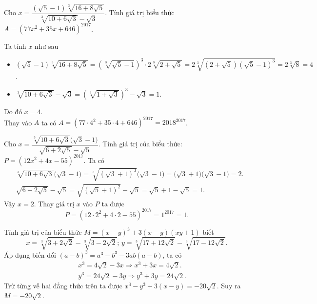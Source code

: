 \begin{bt}%
	Cho $x=\dfrac{(\sqrt{5}-1)\sqrt[3]{16+8\sqrt{5}}}{\sqrt[3]{10+6\sqrt{3}}-\sqrt{3}}$. Tính giá trị biểu thức $A=(77x^2+35x+646)^{2017}$.
	\loigiai
	{
		Ta tính $x$ như sau
		\begin{itemize}
			\item $\left(\sqrt{5}-1\right)\sqrt[3]{16+8\sqrt{5}}=\left(\sqrt[3]{\sqrt{5}-1}\right)^3 \cdot 2\sqrt[3]{2+\sqrt{5}} = 2\sqrt[3]{\left(2+\sqrt{5}\right)\left(\sqrt{5}-1\right)^3}=2\sqrt[3]{8}=4  $.
			\item $\sqrt[3]{10+6\sqrt{3}}-\sqrt{3}=\left(\sqrt[3]{1+\sqrt{3}}\right)^3-\sqrt{3}=1$.
		\end{itemize}
		Do đó $x=4$.\\
		Thay vào $A$ ta có $A=(77 \cdot 4^2 + 35 \cdot 4 +646)^{2017} = 2018^{2017}$.
	}
\end{bt}

\begin{bt}%
	Cho $x=\dfrac{\sqrt[3]{10+6\sqrt{3}}\Big(\sqrt{3}-1\Big)}{\sqrt{6+2\sqrt{5}}-\sqrt{5}}$. Tính giá trị của biểu thức: $P=(12x^2+4x-55)^{2017}$.
	\loigiai
	{
		Ta có
		\begin{align*}
		& \sqrt[3]{10+6\sqrt{3}}\Big(\sqrt{3}-1\Big)=\sqrt[3]{(\sqrt{3}+1)^3}\Big(\sqrt{3}-1\Big)=\Big(\sqrt{3}+1\Big)\Big(\sqrt{3}-1\Big)=2.\\
		& \sqrt{6+2\sqrt{5}}-\sqrt{5}=\sqrt{(\sqrt{5}+1)^2}-\sqrt{5}=\sqrt{5}+1-\sqrt{5}=1.
		\end{align*}
		Vậy $x=2$. Thay giá trị $x$ vào $P$ ta được $$P=(12 \cdot 2^2+4 \cdot 2-55)^{2017}=1^{2017}=1.$$
	}
\end{bt}

\begin{bt}%
	Tính giá trị của biểu thức $M = \left(x-y \right)^3+3 \left(x-y \right) \left(xy+1 \right)$ biết
	$$x= \sqrt[3]{3+2 \sqrt{2}}- \sqrt[3]{3-2 \sqrt{2}};\, y= \sqrt[3]{17+12 \sqrt{2}}-\sqrt[3]{17-12\sqrt{2}}.$$
	\loigiai
	{
		Áp dụng biến đổi $(a-b)^3=a^3-b^3-3ab(a-b)$, ta có
		\allowdisplaybreaks
		\begin{eqnarray*}
			&& x^3=4 \sqrt{2}-3x  \Rightarrow x^3+3x=4 \sqrt{2}.\\
			&& y^3=24 \sqrt{2}-3y \Rightarrow y^3+3y=24 \sqrt{2}.
		\end{eqnarray*}
		Trừ từng vế hai đẳng thức trên ta được $x^3-y^3+3(x-y)=-20 \sqrt{2}$. Suy ra $M=-20 \sqrt{2}$.
	}
\end{bt}

